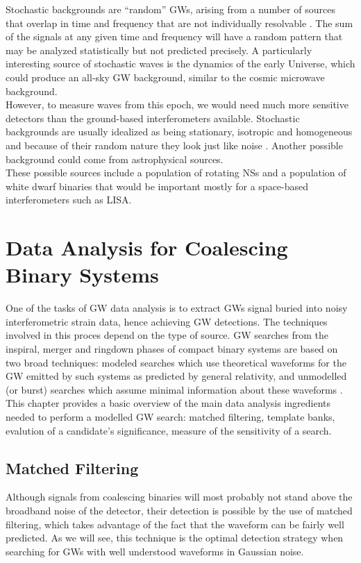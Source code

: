 \documentclass[binding=0.6cm, LaM]{sapthesis}
\begin{document}
	Stochastic backgrounds are “random” GWs, 
	arising from a  number of sources that overlap 
	in time and frequency that are not individually resolvable \cite{22}. 
	The sum of the signals at any given time and frequency will have 
	a random pattern that may be analyzed statistically but not predicted precisely.
	A particularly interesting source of stochastic waves is the dynamics of the early Universe, 
	which could produce an all-sky GW background, 
	similar to the cosmic microwave background. \\ 
	However, to measure waves from this epoch, 
	we would need much more sensitive detectors than the ground-based interferometers available.
	Stochastic backgrounds are usually idealized as being stationary, 
	isotropic and homogeneous and because of their random nature they look just like noise \cite{4}.	
	Another possible background could come from astrophysical sources. \\ 
	These possible sources include a population of rotating NSs 
	and a population of white dwarf binaries that would be important mostly for a space-based interferometers such as LISA. 

\chapter{Data Analysis for Coalescing Binary Systems}

	One of the tasks of GW data analysis is to extract GWs signal 
	buried into noisy interferometric strain data, hence achieving GW detections.
	The techniques involved in this proces depend on the type of source.
	GW searches from the inspiral, merger and ringdown phases of compact binary systems 
	are based on two broad techniques: 
	modeled searches which use theoretical waveforms for the GW emitted by such systems 
	as predicted by general relativity, and 
	unmodelled (or burst) searches which assume minimal information about these waveforms \cite{23}.
        This chapter provides a basic overview of the main data analysis ingredients needed to perform a modelled GW search:
        matched filtering, template banks, evalution of a candidate's significance, measure of the sensitivity of a search.

\section{Matched Filtering}
	Although signals from coalescing binaries will most probably not stand above the broadband noise of the detector, 
	their detection is possible by the use of matched filtering, 
	which takes advantage of the fact that the waveform can be fairly well predicted. 
	As we will see, this technique is the optimal detection strategy when searching for GWs
        with well understood waveforms in Gaussian noise.
\end{document}
